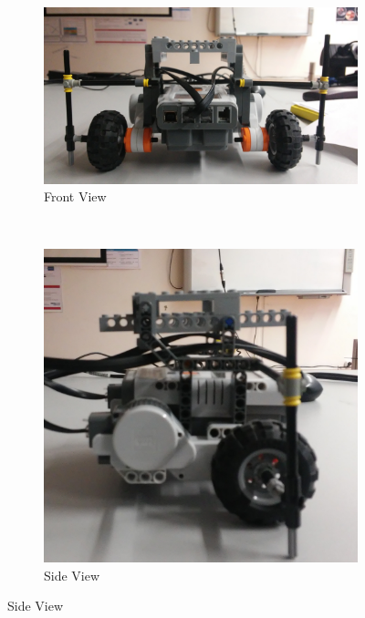 \documentclass[paper=a4, fontsize=11pt]{scrartcl} %
\numberwithin{equation}{section} %
\numberwithin{figure}{section} %
\numberwithin{table}{section} %
\begin{document}
\begin{figure}[H]
    \centering
    \begin{subfigure}[b]{0.3\textwidth}
        \includegraphics[width=\textwidth]{front.jpg}
        \caption{Front View}
        \label{fig:front}
    \end{subfigure}
    ~ %
    \begin{subfigure}[b]{0.3\textwidth}
        \includegraphics[width=\textwidth]{side.jpg}
        \caption{Side View}
        \label{fig:side}
    \end{subfigure}

\end{figure}
\end{document}
